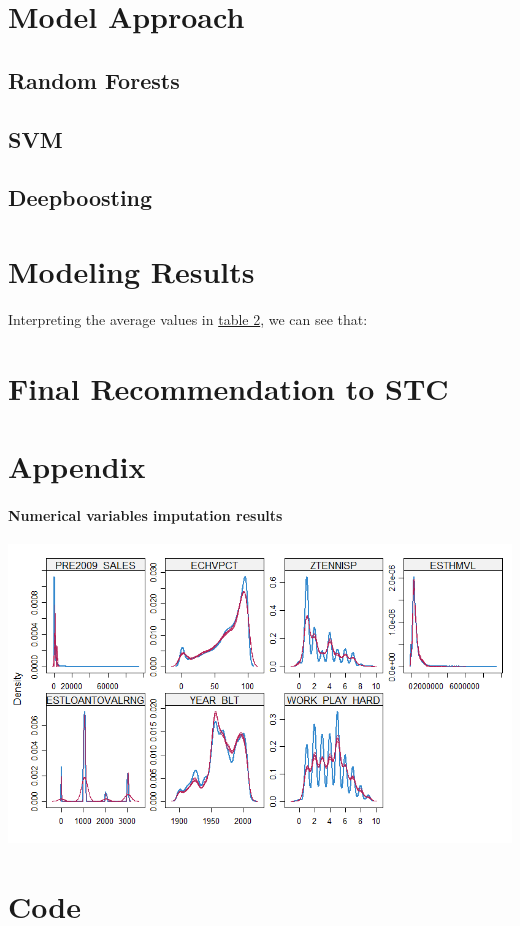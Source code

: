 \documentclass[10pt,]{article}
\let\oldparagraph\paragraph
\renewcommand{\paragraph}[1]{\oldparagraph{#1}\mbox{}}
\begin{document}
\section{Model Approach}\label{model-approach}

\subsection{Random Forests}\label{random-forests}

\subsection{SVM}\label{svm}

\subsection{Deepboosting}\label{deepboosting}

\section{Modeling Results}\label{modeling-results}

Interpreting the average values in
\protect\hyperlink{overall_beta_table}{table 2}, we can see that:

\section{Final Recommendation to STC}\label{final-recommendation-to-stc}

\newpage

\section{Appendix}\label{appendix}

\hypertarget{impute_num}{\paragraph{Numerical variables imputation
results}\label{impute_num}}

\includegraphics[width=0.8\linewidth]{images/report_mice_num}

\newpage

\section{Code}\label{code}
\end{document}
